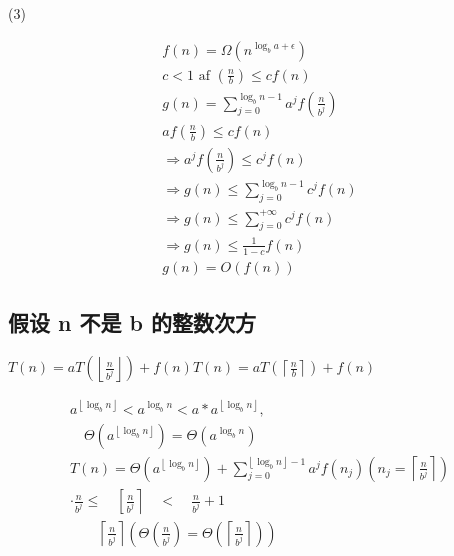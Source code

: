 (3)

$$
  \begin{array}{l}
    f(n)=\Omega\left(n^{\log _{b} a+\epsilon}\right)                    \\
    c<1 \text { af }\left(\frac{n}{b}\right) \leq c f(n)                \\
    g(n)=\sum_{j=0}^{\log _{b} n-1} a^{j} f\left(\frac{n}{b^{j}}\right) \\
    a f\left(\frac{n}{b}\right) \leq c f(n)                             \\
    \Rightarrow a^{j} f\left(\frac{n}{b^{j}}\right) \leq c^{j} f(n)     \\
    \Rightarrow g(n) \leq \sum_{j=0}^{\log _{b} n-1} c^{j} f(n)         \\
    \Rightarrow g(n) \leq \sum_{j=0}^{+\infty} c^{j} f(n)               \\
    \Rightarrow g(n) \leq \frac{1}{1-c} f(n)                            \\
    g(n)=O(f(n))
  \end{array}
$$

\subsection{假设 n 不是 b 的整数次方}
$T(n)=a T\left(\left\lfloor\frac{n}{b^{j}}\right\rfloor\right)+f(n) T(n)=a T\left(\left\lceil\frac{n}{b}\right\rceil\right)+f(n)$

$$
  \begin{array}{c}
    a^{\left\lfloor\log _{b} n\right\rfloor}<a^{\log _{b} n}<a * a^{\left\lfloor\log _{b} n\right\rfloor},                                                                                             \\\quad \Theta\left(a^{\left\lfloor\log _{b} n\right\rfloor}\right)=\Theta\left(a^{\log _{b} n}\right)\\T(n)=
    \Theta\left(a^{\left\lfloor\log _{b} n\right\rfloor}\right)+\sum_{j=0}^{\left\lfloor\log _{b} n\right\rfloor-1} a^{j} f\left(n_{j}\right)\left(n_{j}=\left\lceil\frac{n}{b^{j}}\right\rceil\right) \\
    \cdot \frac{n}{b^{j}} \leq \quad\left[\frac{n}{b^{j}}\right\rceil \quad<\quad \frac{n}{b^{j}}+1                                                                                                    \\ \quad  \quad  \left\lceil\frac{n}{b^{j}}\right\rceil\left(\Theta\left(\frac{n}{b^{j}}\right)=\right.
    \left.\Theta\left(\left\lceil\frac{n}{b^{j}}\right\rceil\right)\right)
  \end{array}
$$

